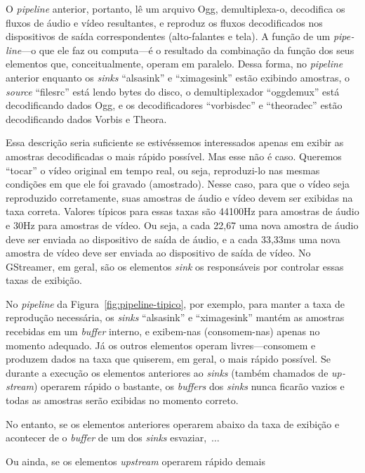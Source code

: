 \documentclass{SBCbookchapter}
\def\en#1{\foreignlanguage{english}{\emph{#1}}}
\begin{document}
O \en{pipeline} anterior, portanto, lê um arquivo Ogg, demultiplexa-o,
decodifica os fluxos de áudio e vídeo resultantes, e reproduz os fluxos
decodificados nos dispositivos de saída correspondentes (alto-falantes e
tela).  A função de um \en{pipeline}---o que ele faz ou computa---é o
resultado da combinação da função dos seus elementos que, conceitualmente,
operam em paralelo.  Dessa forma, no \en{pipeline} anterior enquanto os
\en{sinks} ``alsasink'' e ``ximagesink'' estão exibindo amostras, o
\en{source} ``filesrc'' está lendo bytes do disco, o demultiplexador
``oggdemux'' está decodificando dados Ogg, e os decodificadores
``vorbisdec'' e ``theoradec'' estão decodificando dados Vorbis e Theora.

\clearpage
Essa descrição seria suficiente se estivéssemos interessados apenas em
exibir as amostras decodificadas o mais rápido possível.  Mas esse não é
caso.  Queremos ``tocar'' o vídeo original em tempo real, ou seja,
reproduzi-lo nas mesmas condições em que ele foi gravado (amostrado).  Nesse
caso, para que o vídeo seja reproduzido corretamente, suas amostras de áudio
e vídeo devem ser exibidas na taxa correta.  Valores típicos para essas
taxas são 44100Hz para amostras de áudio e 30Hz para amostras de vídeo.  Ou
seja, a cada 22{,}67 uma nova amostra de áudio deve ser enviada ao
dispositivo de saída de áudio, e a cada 33{,}33ms uma nova amostra de vídeo
deve ser enviada ao dispositivo de saída de vídeo.  No GStreamer, em geral,
são os elementos \en{sink} os responsáveis por controlar essas taxas de
exibição.

No \en{pipeline} da Figura~\ref{fig:pipeline-tipico}, por exemplo, para
manter a taxa de reprodução necessária, os \en{sinks} ``alsasink'' e
``ximagesink'' mantém as amostras recebidas em um \en{buffer} interno, e
exibem-nas (consomem-nas) apenas no momento adequado.  Já os outros
elementos operam livres---consomem e produzem dados na taxa que quiserem, em
geral, o mais rápido possível.  Se durante a execução os elementos
anteriores ao \en{sinks} (também chamados de \en{upstream}) operarem rápido
o bastante, os \en{buffers} dos \en{sinks} nunca ficarão vazios e todas as
amostras serão exibidas no momento correto.

No entanto, se os elementos anteriores operarem abaixo da taxa de exibição e
acontecer de o \en{buffer} de um dos \en{sinks} esvaziar,~$\dots$

Ou ainda, se os elementos \en{upstream} operarem rápido demais
\end{document}
